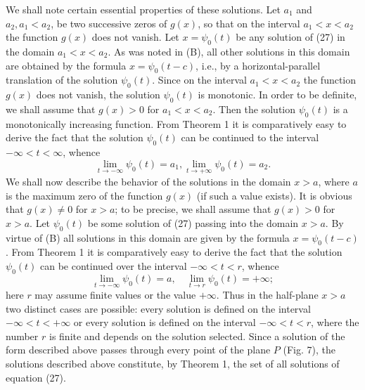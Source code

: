 \documentclass[10pt,a5paper]{book}
\theoremstyle{plain}
\theoremstyle{definition}
\theoremstyle{remark}
\begin{document}
We shall note certain essential properties of these solutions. Let $a_{1}$ and $a_{2}, a_{1}<a_{2}$, be two successive zeros of $g(x)$, so that on the interval $a_{1}<x<a_{2}$ the function $g(x)$ does not vanish. Let $x=\psi_{0}(t)$ be any solution of (27) in the domain $a_{1}<x<a_{2}$. As was noted in (B), all other solutions in this domain are obtained by the formula $x=\psi_{0}(t-c)$, i.e., by a horizontal-parallel translation of the solution $\psi_{0}(t)$. Since on the interval $a_{1}<x<a_{2}$ the function $g(x)$ does not vanish, the solution $\psi_{0}(t)$ is monotonic. In order to be definite, we shall assume that $g(x)>0$
for $a_{1}<x<a_{2}$. Then the solution $\psi_{0}(t)$ is a monotonically increasing function. From Theorem 1 it is comparatively easy to derive the fact that the solution $\psi_{0}(t)$ can be continued to the interval $-\infty<t<\infty$, whence
\[
\lim _{t \rightarrow-\infty} \psi_{0}(t)=a_{1}, \lim _{t \rightarrow+\infty} \psi_{0}(t)=a_{2} .
\]
We shall now describe the behavior of the solutions in the domain $x>a$, where $a$ is the maximum zero of the function $g(x)$ (if such a value exists). It is obvious that $g(x) \neq 0$ for $x>a$; to be precise, we shall assume that $g(x)>0$ for $x>a$. Let $\psi_{0}(t)$ be some solution of (27) passing into the domain $x>a$. By virtue of (B) all solutions in this domain are given by the formula $x=\psi_{0}(t-c)$. From Theorem 1 it is comparatively easy to derive the fact that the solution $\psi_{0}(t)$ can be continued over the interval $-\infty<t<r$, whence
\[
\lim _{t \rightarrow-\infty} \psi_{0}(t)=a, \quad \lim _{t \rightarrow r} \psi_{0}(t)=+\infty ;
\]
here $r$ may assume finite values or the value $+\infty$. Thus in the half-plane $x>a$ two distinct cases are possible: every solution is defined on the interval $-\infty<t<+\infty$ or every solution is defined on the interval $-\infty<t<r$, where the number $r$ is finite and depends on the solution selected. Since a solution of the form described above passes through every point of the plane $P$ (Fig. 7), the solutions described above constitute, by Theorem 1, the set of all solutions of equation (27).
\end{document}
